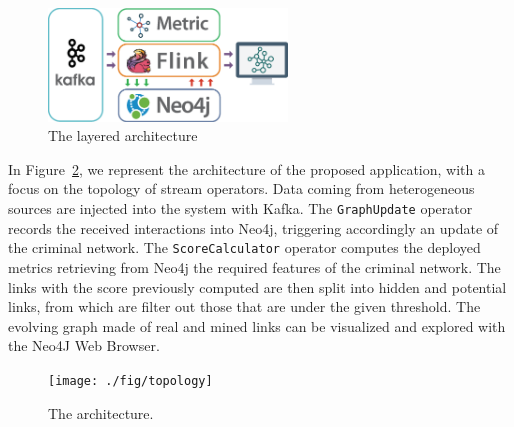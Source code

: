 \begin{figure}
\centering
\includegraphics[width=2.5in]{./fig/crimegraph-layered-architecture}
\caption{The layered architecture}
\label{fig:topology_layered}
\end{figure}

In Figure~\ref{fig:topology}, we represent the architecture of the proposed application, with a focus on the topology of stream operators. Data coming from heterogeneous sources are injected into the system with Kafka. The \texttt{GraphUpdate} operator records the received interactions into Neo4j, triggering accordingly an update of the criminal network.
The \texttt{ScoreCalculator} operator computes the deployed metrics retrieving from Neo4j the required features of the criminal network. The links with the score previously computed are then split into hidden and potential links, from which are filter out those that are under the given threshold.
The evolving graph made of real and mined links can be visualized and explored with the Neo4J Web Browser.

\begin{figure}
\centering
\texttt{[image: ./fig/topology]}
\caption{The architecture.}
\label{fig:topology}
\end{figure}
